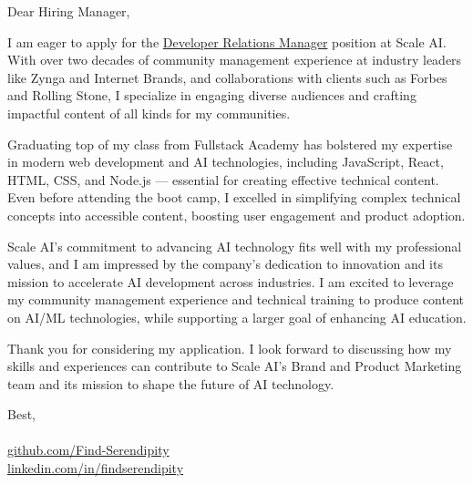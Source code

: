 \documentclass{letter}
\date{June 17, 2024 }
\begin{document}
\begin{letter}{}
	\opening{Dear Hiring Manager,}

	I am eager to apply for the
	\href{https://boards.greenhouse.io/scaleai/jobs/4368630005}{Developer
		Relations
		Manager} position at Scale AI. With over two decades of
	community management experience at industry leaders like Zynga and Internet
	Brands, and collaborations with clients such as Forbes and Rolling Stone, I
	specialize in engaging diverse audiences and crafting impactful content of all
	kinds for my communities.

	Graduating top of my class from Fullstack Academy has bolstered my
	expertise in modern web development and AI technologies, including JavaScript,
	React, HTML, CSS, and Node.js — essential for creating effective technical
	content. Even before attending the boot camp, I excelled in simplifying complex
	technical concepts into accessible content, boosting user engagement and
	product adoption.

	Scale AI’s commitment to advancing AI technology fits well with my
	professional values, and I am impressed by the company's dedication to
	innovation and its mission to accelerate AI development across industries. I am
	excited to leverage my community management experience and technical training
	to produce content on AI/ML technologies, while supporting a larger goal of
	enhancing AI education.

	Thank you for considering my application. I look forward to discussing
	how my skills and experiences can contribute to Scale AI’s Brand and Product
	Marketing team and its mission to shape the future of AI technology.

	\closing{Best,\\
		 \\
		{\href{https://github.com/Find-Serendipity}{github.com/Find-Serendipity}} \\
		{\href{https://www.linkedin.com/in/findserendipity/}{linkedin.com/in/findserendipity}}
	}

\end{letter}
\end{document}
